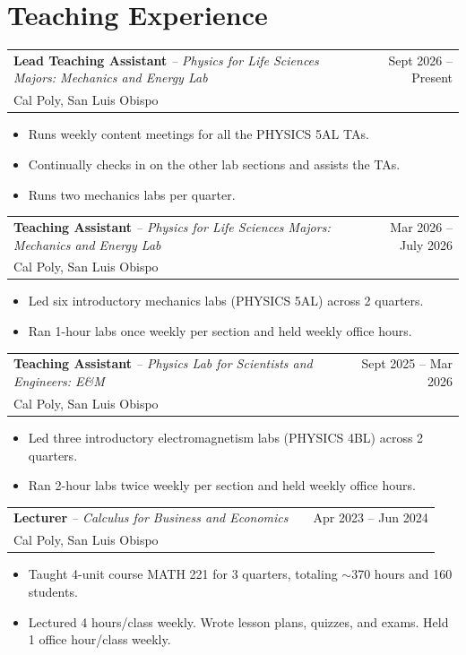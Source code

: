 \documentclass[a4paper,11pt]{article}
\makeatletter
\newenvironment{jobcustomlong}[4]
    {
    \begin{tabularx}{\linewidth}{@{}l X r@{}}
    \textbf{#1} \textit{#2} & \hfill &  #3 \\[-2.5pt]
    \textcolor{black!55!white}{\small #4} \\[2.5pt]
    \end{tabularx}
    \begin{minipage}[t]{\linewidth}
    \begin{itemize}[nosep,after=\strut, leftmargin=1.75em, itemsep=1pt,label={\small$\bullet$}]
    }
    {
    \end{itemize} \vspace{.325em}
    \end{minipage}   
    }
\newcommand{\calpoly}{\textcolor{black!55!white}{Cal Poly, San Luis Obispo}}
\makeatother
\begin{document}
\section{Teaching Experience}

\begin{jobcustomlong}{Lead Teaching Assistant}{-- Physics for Life Sciences Majors: Mechanics and Energy Lab}{Sept 2026 -- Present}{\calpoly}
    \item Runs weekly content meetings for all the PHYSICS 5AL TAs.
    \item Continually checks in on the other lab sections and assists the TAs.
    \item Runs two mechanics labs per quarter.
\end{jobcustomlong}
\begin{jobcustomlong}{Teaching Assistant}{-- Physics for Life Sciences Majors: Mechanics and Energy Lab}{Mar 2026 -- July 2026}{\calpoly}
    \item Led six introductory mechanics labs (PHYSICS 5AL) across 2 quarters.
    \item Ran 1-hour labs once weekly per section and held weekly office hours.
\end{jobcustomlong}
\begin{jobcustomlong}{Teaching Assistant}{-- Physics Lab for Scientists and Engineers: E\&M}{Sept 2025 -- Mar 2026}{\calpoly}
    \item Led three introductory electromagnetism labs (PHYSICS 4BL) across 2 quarters.
    \item Ran 2-hour labs twice weekly per section and held weekly office hours.
\end{jobcustomlong}
\begin{jobcustomlong}{Lecturer}{-- Calculus for Business and Economics}{Apr 2023 -- Jun 2024}{\calpoly}
    \item Taught 4-unit course MATH 221 for 3 quarters, totaling $\sim$370 hours and 160 students.
    \item Lectured 4 hours/class weekly. Wrote lesson plans, quizzes, and exams. Held 1 office hour/class weekly.
\end{jobcustomlong}
\vspace{-1.5em}
\end{document}
